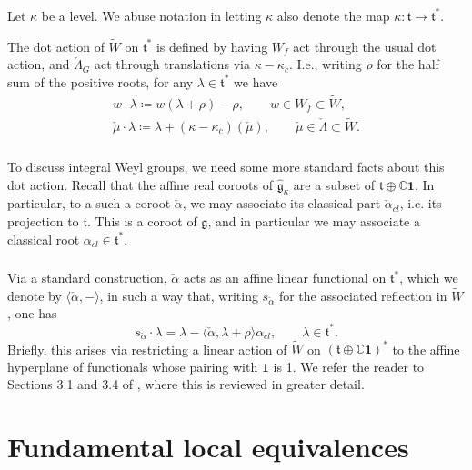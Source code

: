 \documentclass[11pt,reqno]{amsart}
\newcommand{\g}{\widehat{\mathfrak{g}}}
\newcommand{\halpha}{\check{\alpha}}
\newcommand{\ft}{\mathfrak{t}}
\newcommand{\fg}{\mathfrak{g}}
\newcommand{\gk}{\g_\kappa}
\theoremstyle{remark}
\numberwithin{equation}{section}
\begin{document}
\subsubsection{}
\label{sss:dotaction}
Let $\kappa$ be a level. 
We abuse notation in letting $\kappa$ also denote the map
$\kappa:\ft \to \ft^*$.
 
The dot action of
$\widetilde{W}$ on $\ft^*$ is defined by having $W_f$ act through the usual dot 
action, and $\check{\Lambda}_G$ act through translations via $\kappa - 
\kappa_c$. I.e., writing $\rho$ for the half sum of the positive roots, for any 
$\lambda \in \ft^*$ we have
\[
\begin{gathered}
w \cdot \lambda \coloneqq w(\lambda+\rho)-\rho, 
\quad \quad w \in W_f \subset
\widetilde{W},  \\
\check{\mu} \cdot \lambda \coloneqq 
\lambda+(\kappa-\kappa_c)(\check{\mu}), 
\quad\quad  \check{\mu} \in \check{\Lambda} \subset 
\widetilde{W}.
\end{gathered}
\]
\subsubsection{} To discuss integral Weyl groups, we need some more standard 
facts about this dot action. Recall that the affine real coroots of $\gk$ are a 
subset of 
$\ft \oplus \mathbb{C} \mathbf{1}$. In particular, to a such a coroot 
$\halpha$, we may associate its classical part $\halpha_{cl}$, i.e. its 
projection to $\ft$. This is a coroot of $\fg$, and in particular we may 
associate a classical root $\alpha_{cl} \in \ft^*$.  


\subsubsection{}\label{sss:affcoroots} Via a standard construction, $\halpha$ 
acts as an affine 
linear functional on $\ft^*$, which we denote by $\langle \halpha, -\rangle$,  
in such a way that, 
writing $s_{\halpha}$ for the associated reflection in $\widetilde{W}$, one has 
%
\[
 s_{\halpha} \cdot \lambda = \lambda - \langle\halpha, \lambda + \rho \rangle 
 \alpha_{cl}, \quad \quad \lambda \in \ft^*. 
\]
%
Briefly, this arises via restricting a linear action of $\widetilde{W}$ on 
$(\ft \oplus \mathbb{C} \mathbf{1})^*$ to the affine hyperplane of functionals 
whose pairing with $\mathbf{1}$ is 1. We refer the reader to 
Sections 3.1 and 
3.4 of \cite{lpw}, where this is reviewed in greater detail. 


\section{Fundamental local equivalences} \label{s:fle}
\end{document}
